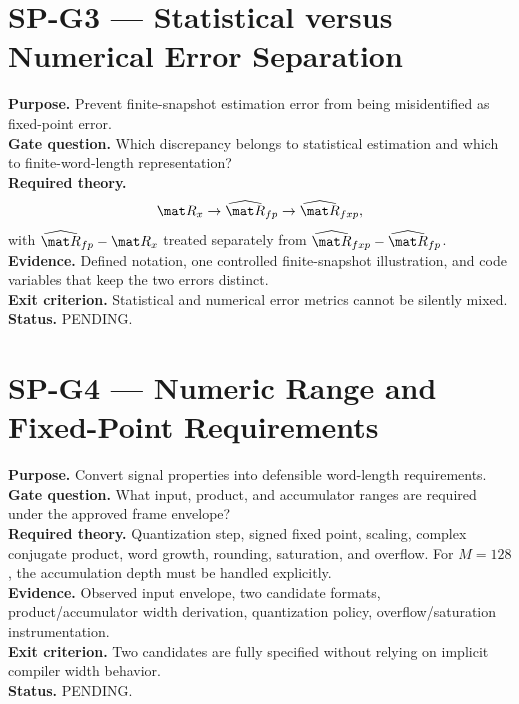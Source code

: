 \section{SP-G3 --- Statistical versus Numerical Error Separation}
\textbf{Purpose.} Prevent finite-snapshot estimation error from being misidentified as
fixed-point error.\\
\textbf{Gate question.} Which discrepancy belongs to statistical estimation and which to
finite-word-length representation?\\
\textbf{Required theory.}
\begin{equation}
\mat R_x \rightarrow \widehat{\mat R}_{fp} \rightarrow \widehat{\mat R}_{fxp},
\end{equation}
with $\widehat{\mat R}_{fp}-\mat R_x$ treated separately from
$\widehat{\mat R}_{fxp}-\widehat{\mat R}_{fp}$.\\
\textbf{Evidence.} Defined notation, one controlled finite-snapshot illustration, and code
variables that keep the two errors distinct.\\
\textbf{Exit criterion.} Statistical and numerical error metrics cannot be silently mixed.\\
\textbf{Status.} PENDING.

\section{SP-G4 --- Numeric Range and Fixed-Point Requirements}
\textbf{Purpose.} Convert signal properties into defensible word-length requirements.\\
\textbf{Gate question.} What input, product, and accumulator ranges are required under the
approved frame envelope?\\
\textbf{Required theory.} Quantization step, signed fixed point, scaling, complex
conjugate product, word growth, rounding, saturation, and overflow. For $M=128$, the
accumulation depth must be handled explicitly.\\
\textbf{Evidence.} Observed input envelope, two candidate formats, product/accumulator
width derivation, quantization policy, overflow/saturation instrumentation.\\
\textbf{Exit criterion.} Two candidates are fully specified without relying on implicit
compiler width behavior.\\
\textbf{Status.} PENDING.

